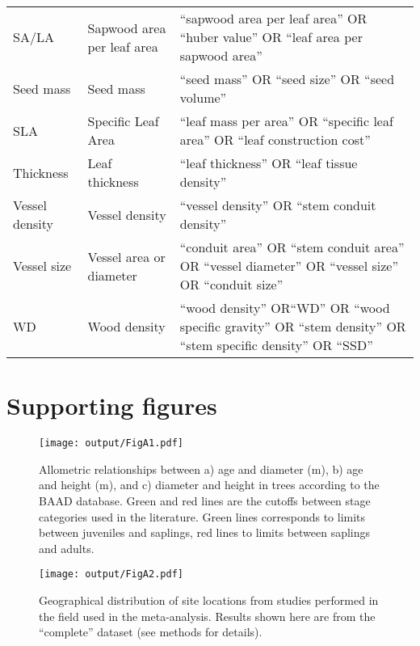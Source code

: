 \documentclass[a4paper]{article}\usepackage[]{graphicx}\usepackage[]{color}
\begin{document}
\begin{appendices}
\begin{table}[h!]
\begin{tabular}{p{3cm}p{3cm}p{8cm}}
  SA/LA & Sapwood area per leaf area & ``sapwood area per leaf area'' OR ``huber value'' OR ``leaf area per sapwood area'' \\
  Seed mass & Seed mass & ``seed mass'' OR ``seed size'' OR ``seed volume'' \\
  SLA & Specific Leaf Area & ``leaf mass per area'' OR ``specific leaf area'' OR ``leaf construction cost'' \\
  Thickness & Leaf thickness & ``leaf thickness''  OR ``leaf tissue density'' \\
  Vessel density & Vessel density & ``vessel density'' OR ``stem conduit density'' \\
  Vessel size & Vessel area or diameter & ``conduit area'' OR ``stem conduit area'' OR ``vessel diameter'' OR ``vessel size'' OR ``conduit size''   \\
  WD & Wood density & ``wood density'' OR``WD'' OR ``wood specific gravity'' OR ``stem density'' OR ``stem specific density'' OR ``SSD'' \\
   \hline
\end{tabular}
\end{table}


\clearpage
\section{Supporting figures}\label{app:supp_info_figures}


\begin{figure}[h!]
\centering
\texttt{[image: output/FigA1.pdf]}
\caption{Allometric relationships between a) age and diameter (m), b) age and height (m), and c) diameter and height in trees according to the BAAD database. Green and red lines are the cutoffs between stage categories used in the literature. Green lines corresponds to limits between juveniles and saplings, red lines to limits between saplings and adults.}
\label{fig:figA1}
\end{figure}


\begin{figure}[h!]
\centering
\texttt{[image: output/FigA2.pdf]}
\caption{Geographical distribution of site locations from studies performed in the field used in the meta-analysis. Results shown here are from the ``complete'' dataset (see methods for details).}
\label{fig:figA2}
\end{figure}



\end{appendices}
\end{document}
